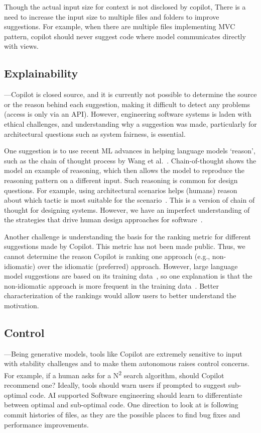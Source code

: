Though the actual input size for context is not disclosed by copilot, There is a need to increase the input size to multiple files and folders to improve suggestions. For example, when there are multiple files implementing MVC pattern, copilot should never suggest code where model communicates directly with views.

\subsection{Explainability}---Copilot is closed source, and it is currently not possible to determine the source or the reason behind each suggestion, making it difficult to detect any problems (access is only via an API). 
However, engineering software systems is laden with ethical challenges, and understanding why a suggestion was made, particularly for architectural questions such as system fairness, is essential. 

One suggestion is to use recent ML advances in helping language models `reason', such as the chain of thought process by Wang et al.~\cite{chain_of_thought}. 
Chain-of-thought shows the model an example of reasoning, which then allows the model to reproduce the reasoning pattern on a different input.
Such reasoning is common for design questions. 
For example, using architectural scenarios helps (humans) reason about which tactic is most suitable for the scenario~\cite{kazman98}. This is a version of chain of thought for designing systems. 
However, we have an imperfect understanding of the strategies that drive human design approaches for software~\cite{Arab2022}. 

Another challenge is understanding the basis for the ranking metric for different suggestions made by Copilot. This metric has not been made public. Thus, we cannot determine the reason Copilot is ranking one approach (e.g., non-idiomatic) over the idiomatic (preferred) approach. However, large language model suggestions are based on its training data~\cite{training_extraction}, so one explanation is that the non-idiomatic approach is more frequent in the training data~\cite{stochastic_parrots}. Better characterization of the rankings would allow users to better understand the motivation. 

\subsection{Control}---Being generative models, tools like Copilot are extremely sensitive to input with stability challenges and to make them autonomous raises control concerns.
For example, if a human asks for a N\textsuperscript{2} search algorithm, should Copilot recommend one? 
Ideally, tools should warn users if prompted to suggest sub-optimal code. 
AI supported Software engineering should learn to differentiate between optimal and sub-optimal code. 
One direction to look at is following commit histories of files, as they are the possible places to find bug fixes and performance improvements.


